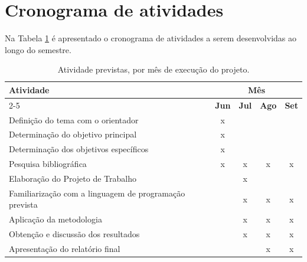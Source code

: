 
\section{Cronograma de atividades}

 Na Tabela \ref{cronograma} é apresentado o cronograma de atividades a serem desenvolvidas ao longo do semestre.

\begin{table}[h]
\captionsetup{labelfont=bf,size=normalsize,name=qqq}
\caption{Atividade previstas, por mês de execução do projeto.}
\centering
\begin{tabular}{|l|c|c|c|c|}
\hline \hline
\multirow{2}{*}{\textbf{Atividade}}  & \multicolumn{4}{c|}{\textbf{Mês}} \\ \cline{2-5} 
      & \textbf{Jun}      & \textbf{Jul}      & \textbf{Ago}      & \textbf{Set}     \\ \hline \hline
Definição do tema com o   orientador                         & x                 &                   &                  &                                    \\ \hline
Determinação do objetivo   principal                         & x                 &                   &                  &                                 \\ \hline
Determinação dos objetivos   específicos                     & x                 &                   &                  &                                  \\ \hline
Pesquisa bibliográfica                                       & x                 & x                 & x                & x                               \\ \hline
Elaboração do Projeto de   Trabalho                          &                   & x                 &                  &                                   \\ \hline
Familiarização com a linguagem de programação prevista                 &                   & x                 & x                & x                              \\ \hline
Aplicação  da   metodologia                 &                   & x                 & x                & x                                \\ \hline
Obtenção e discussão dos resultados                            &                   & x                 & x                & x                              \\ \hline
Apresentação do relatório final                                    &                   &                   & x                &  x                                \\ \hline \hline
\end{tabular}
\label{cronograma}
\end{table}


